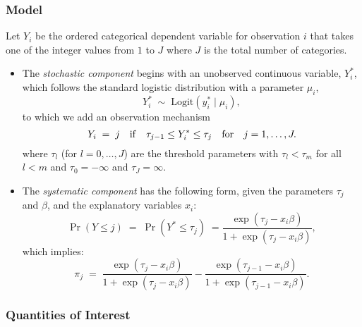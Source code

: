 \subsubsection{Model}

Let $Y_i$ be the ordered categorical dependent variable for
observation $i$ that takes one of the integer values from $1$ to $J$
where $J$ is the total number of categories.
  
\begin{itemize}
\item The \emph{stochastic component} begins with an unobserved continuous
  variable, $Y^*_i$, which follows the standard logistic distribution
  with a parameter $\mu_i$,
  \begin{equation*}
    Y_i^* \; \sim \; \textrm{Logit}(y_i^* \mid \mu_i),  
  \end{equation*}
  to which we add an observation mechanism
  \begin{equation*}
    Y_i \; = \; j \quad {\rm if} \quad \tau_{j-1} \le Y_i^* \le \tau_j
    \quad {\rm for} \quad j=1,\dots,J.
  \end{equation*}
  where $\tau_l$ (for $l=0,\dots,J$) are the threshold parameters with
  $\tau_l < \tau_m$ for all $l<m$ and $\tau_0=-\infty$ and
  $\tau_J=\infty$.
  
\item The \emph{systematic component} has the following form, given
  the parameters $\tau_j$ and $\beta$, and the explanatory variables $x_i$: 
  \begin{equation*}
    \Pr(Y \le j) \; = \; \Pr(Y^* \le \tau_j) \; = \frac{\exp(\tau_j -
      x_i \beta)}{1+\exp(\tau_j -x_i \beta)},
  \end{equation*}
  which implies:
  \begin{equation*}
    \pi_{j}  \; = \; \frac{\exp(\tau_j - x_i \beta)}{1 + \exp(\tau_j -
      x_i \beta)} - \frac{\exp(\tau_{j-1} - x_i \beta)}{1 +
      \exp(\tau_{j-1} - x_i \beta)}.
  \end{equation*}
\end{itemize}

\subsubsection{Quantities of Interest} 

